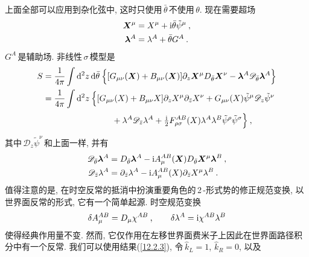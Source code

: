 上面全部可以应用到杂化弦中, 这时只使用$\,\bar{\theta}\,$不使用$\,\theta$. 现在需要超场
\begin{subequations}
\begin{align}
    \bm{X}^{\mu} &= X^{\mu}+\mathrm{i}\bar{\theta}\tilde{\psi}^{\mu} \:, \label{12.3.29a} \\
    \bm{\lambda}^{A} &= \lambda^{A} + \bar{\theta}G^{A} \:. \label{12.3.29b} 
\end{align} \label{12.3.29}
\end{subequations}
$G^{A}\,$是辅助场. 非线性$\,\sigma\,$模型是
\begin{align}
    S&= \frac{1}{4\pi} \int \dif^{2}z\,\dif\bar{\theta}\:\Bigl\{[G_{\mu\nu}(\bm{X})+B_{\mu\nu}(\bm{X})]
    \partial_{z}\bm{X}^{\mu}D_{\bar{\theta}}\bm{X}^{\nu} 
    - \bm{\lambda}^{A}\mathscr{D}_{\bar{\theta}}\bm{\lambda}^{A} \Bigr\} \nonumber \\
    &=\frac{1}{4\pi} \int \dif^{2}z\:\Bigl\{ [G_{\mu\nu}(X)+B_{\mu\nu}X]\partial_{z}X^{\mu}\partial_{\bar{z}}X^{\nu}
    +G_{\mu\nu}(X)\tilde{\psi}^{\mu}\mathscr{D}_{z}\tilde{\psi}^{\nu} \nonumber \\
    &\phantom{=\frac{1}{4\pi} \int \dif^{2}z\:\Bigl\{ [G_{\mu\nu}}+\lambda^{A}\mathscr{D}_{\bar{z}}\lambda^{A}
    +\tfrac{\mi}{2}F_{\rho\sigma}^{AB}(X)\lambda^{A}\lambda^{B}\tilde{\psi}^{\rho}\tilde{\psi}^{\sigma}\Bigr\}\:,
    \label{12.3.30}
\end{align}
其中$\,\mathscr{D}_{z}\tilde{\psi}^{\nu}\,$和上面一样, 并有
\begin{subequations}
\begin{align}
    \mathscr{D}_{\bar{\theta}}\bm{\lambda}^{A}&=D_{\bar{\theta}}\bm{\lambda}^{A}
    -\mathrm{i} A_{\mu}^{AB}(\bm{X})D_{\bar{\theta}}\bm{X}^{\mu}\bm{\lambda}^{B} \:, \label{12.3.31a} \\
    \mathscr{D}_{\bar{z}}\lambda^{A} &= \partial_{\bar{z}}\lambda^{A} 
    - \mathrm{i} A_{\mu}^{AB}(X)\partial_{\bar{z}}X^{\mu}\lambda^{B} \:. \label{12.3.31b}
\end{align} \label{12.3.31}
\end{subequations}
值得注意的是, 在时空反常的抵消中扮演重要角色的\,2\,-形式势的修正规范变换, 以世界面反常的形式, 它有一个简单起源. 
时空规范变换
\begin{equation}
    \delta A_{\mu}^{AB}= D_{\mu}\chi^{AB} \:, \qquad \delta\lambda^{A} = \mathrm{i} \chi^{AB}\lambda^{B} \label{12.3.32}
\end{equation}
使得经典作用量不变. 然而, 它仅作用在左移世界面费米子上因此在世界面路径积分中有一个反常. 我们可以使用结果(\ref{12.2.3}), 令$\,\hat{k}_{L}=1$, $\hat{k}_{R}=0$, 以及 
